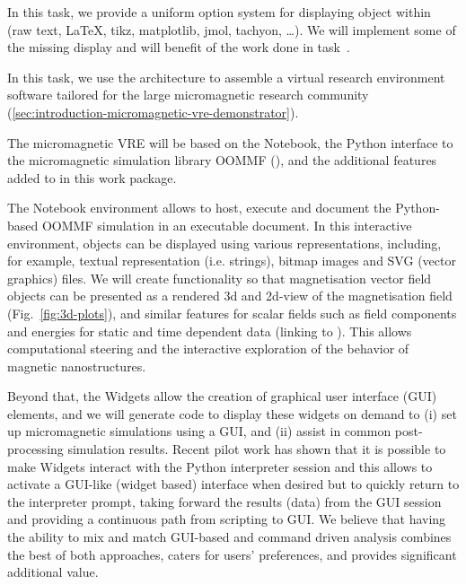 \begin{workpackage}
\begin{tasklist}
\begin{task}[lead=UB,title=Common option system for various displays in Sage,id=Sage-display,PM=12,partners={UB},wphases=0-24]
  In this task, we provide a uniform option system for displaying object within \Sage (raw text, \LaTeX,
  tikz, matplotlib, jmol, tachyon, \ldots). We will implement some of the missing display and will benefit
  of the work done in task~.
\end{task}

\begin{task}[lead=USO,title=Case study: micromagnetic VRE built from
  \TheProject,id=oommf-py-ipython-attributes,PM=6,partners={SR,USH},wphases=9-15]

  In this task, we use the \TheProject architecture to assemble a
  virtual research environment software tailored for the large
  micromagnetic research community
  (\ref{sec:introduction-micromagnetic-vre-demonstrator}).

  The micromagnetic VRE will be based on the \Jupyter Notebook, the
  Python interface to the micromagnetic simulation library OOMMF
  (),
  and the additional features added to \Jupyter in this work
  package.

  The \Jupyter Notebook environment allows to host, execute and
  document the Python-based OOMMF simulation in an executable
  document. In this interactive environment, objects can be displayed
  using various representations, including, for example, textual
  representation (i.e. strings), bitmap images and SVG (vector
  graphics) files. We will create functionality so that magnetisation
  vector field objects can be presented as a rendered 3d and 2d-view
  of the magnetisation field (Fig.~\ref{fig:3d-plots}), and similar
  features for scalar fields such as field components and energies for
  static and time dependent data (linking to
  ). This allows computational steering and the
  interactive exploration of the behavior of magnetic nanostructures.

  Beyond that, the \Jupyter Widgets allow the creation of graphical
  user interface (GUI) elements, and we will generate code to
  display these widgets on demand to (i) set up micromagnetic
  simulations using a GUI, and (ii) assist in common post-processing
  simulation results. Recent pilot work has shown that it is possible
  to make \Jupyter Widgets interact with the Python interpreter
  session and this allows to activate a GUI-like (widget based)
  interface when desired but to quickly return to the interpreter
  prompt, taking forward the results (data) from the GUI session
  \cite{IPython-widget-GUI-demo-youtube-2014} and providing a
  continuous path from scripting to GUI. We believe that having the
  ability to mix and match GUI-based and command driven analysis
  combines the best of both approaches, caters for users' preferences,
  and provides significant additional value.


\end{task}
\end{tasklist}
\end{workpackage}

